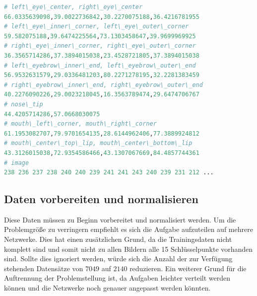 	\begin{lstlisting}[caption={Ein gesamter Datensatz aus den Trainingsdaten mit den X und Y Werten pro Schlüsselpunkt},label=fig:ausgangsdatenRoh,captionpos=b,language=Python]
# left\_eye\_center, right\_eye\_center
66.0335639098,39.0022736842,30.2270075188,36.4216781955
# left\_eye\_inner\_corner, left\_eye\_outer\_corner
59.582075188,39.6474225564,73.1303458647,39.9699969925
# right\_eye\_inner\_corner, right\_eye\_outer\_corner
36.3565714286,37.3894015038,23.4528721805,37.3894015038
# left\_eyebrow\_inner\_end, left\_eyebrow\_outer\_end
56.9532631579,29.0336481203,80.2271278195,32.2281383459
# right\_eyebrow\_inner\_end, right\_eyebrow\_outer\_end
40.2276090226,29.0023218045,16.3563789474,29.6474706767
# nose\_tip
44.4205714286,57.0668030075
# mouth\_left\_corner, mouth\_right\_corner
61.1953082707,79.9701654135,28.6144962406,77.3889924812
# mouth\_center\_top\_lip, mouth\_center\_bottom\_lip
43.3126015038,72.9354586466,43.1307067669,84.4857744361
# image
238 236 237 238 240 240 239 241 241 243 240 239 231 212 ...
\end{lstlisting}

\subsection{Daten vorbereiten und normalisieren}

Diese Daten müssen zu Beginn vorbereitet und normalisiert werden. 
Um die Problemgröße zu verringern empfiehlt es sich die Aufgabe aufzuteilen auf mehrere Netzwerke. 
Dies hat einen zusätzlichen Grund, da die Trainingsdaten nicht komplett sind und somit nicht zu allen Bildern alle 15 Schlüsselpunkte vorhanden sind. 
Sollte dies ignoriert werden, würde sich die Anzahl der zur Verfügung stehenden Datensätze von $7049$ auf $2140$ reduzieren. 
Ein weiterer Grund für die Auftrennung der Problemstellung ist, da Aufgaben leichter verteilt werden können und die Netzwerke noch genauer angepasst werden könnten. \newline

